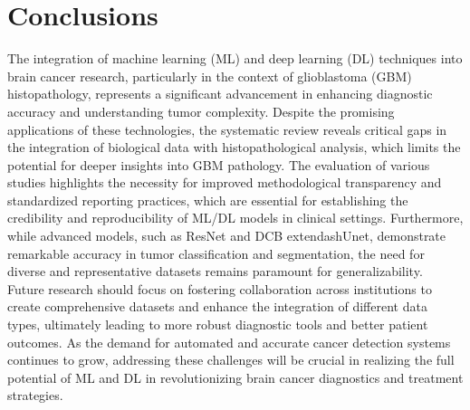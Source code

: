 \documentclass[runningheads]{llncs}
\begin{document}
\section{Conclusions}
The integration of machine learning (ML) and deep learning (DL) techniques into brain cancer research, particularly in the context of glioblastoma (GBM) histopathology, represents a significant advancement in enhancing diagnostic accuracy and understanding tumor complexity. Despite the promising applications of these technologies, the systematic review reveals critical gaps in the integration of biological data with histopathological analysis, which limits the potential for deeper insights into GBM pathology. The evaluation of various studies highlights the necessity for improved methodological transparency and standardized reporting practices, which are essential for establishing the credibility and reproducibility of ML/DL models in clinical settings. Furthermore, while advanced models, such as ResNet and DCB	extendash{}Unet, demonstrate remarkable accuracy in tumor classification and segmentation, the need for diverse and representative datasets remains paramount for generalizability. Future research should focus on fostering collaboration across institutions to create comprehensive datasets and enhance the integration of different data types, ultimately leading to more robust diagnostic tools and better patient outcomes. As the demand for automated and accurate cancer detection systems continues to grow, addressing these challenges will be crucial in realizing the full potential of ML and DL in revolutionizing brain cancer diagnostics and treatment strategies.
\end{document}

